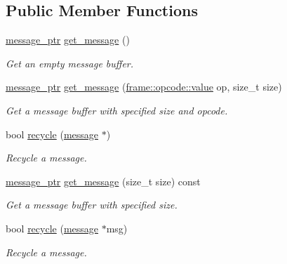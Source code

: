 \subsection*{Public Member Functions}
\begin{DoxyCompactItemize}
\item 
\hyperlink{classwebsocketpp_1_1message__buffer_1_1alloc_1_1con__msg__manager_a2b7d97fc21ff99e307ec20fe0369f294}{message\+\_\+ptr} \hyperlink{classwebsocketpp_1_1message__buffer_1_1alloc_1_1con__msg__manager_ab37990d12c3d54f6963df6b0ddadcf28}{get\+\_\+message} ()
\begin{DoxyCompactList}\small\item\em Get an empty message buffer. \end{DoxyCompactList}\item 
\hyperlink{classwebsocketpp_1_1message__buffer_1_1alloc_1_1con__msg__manager_a2b7d97fc21ff99e307ec20fe0369f294}{message\+\_\+ptr} \hyperlink{classwebsocketpp_1_1message__buffer_1_1alloc_1_1con__msg__manager_ab2163fa7f202ebcbad8e77a6b63d8f17}{get\+\_\+message} (\hyperlink{namespacewebsocketpp_1_1frame_1_1opcode_ae68711643096dfc4af6d66ade3f9fd5e}{frame\+::opcode\+::value} op, size\+\_\+t size)
\begin{DoxyCompactList}\small\item\em Get a message buffer with specified size and opcode. \end{DoxyCompactList}\item 
bool \hyperlink{classwebsocketpp_1_1message__buffer_1_1alloc_1_1con__msg__manager_a6373a7891e108a232a2a62a5696295e8}{recycle} (\hyperlink{classwebsocketpp_1_1message__buffer_1_1message}{message} $\ast$)
\begin{DoxyCompactList}\small\item\em Recycle a message. \end{DoxyCompactList}\item 
\hyperlink{classwebsocketpp_1_1message__buffer_1_1alloc_1_1con__msg__manager_a2b7d97fc21ff99e307ec20fe0369f294}{message\+\_\+ptr} \hyperlink{classwebsocketpp_1_1message__buffer_1_1alloc_1_1con__msg__manager_a9f78f82fbf7f2d253cd94161f0ebc700}{get\+\_\+message} (size\+\_\+t size) const 
\begin{DoxyCompactList}\small\item\em Get a message buffer with specified size. \end{DoxyCompactList}\item 
bool \hyperlink{classwebsocketpp_1_1message__buffer_1_1alloc_1_1con__msg__manager_a4e1013bc89944fbfd222b9ab6ad76712}{recycle} (\hyperlink{classwebsocketpp_1_1message__buffer_1_1message}{message} $\ast$msg)
\begin{DoxyCompactList}\small\item\em Recycle a message. \end{DoxyCompactList}\end{DoxyCompactItemize}


